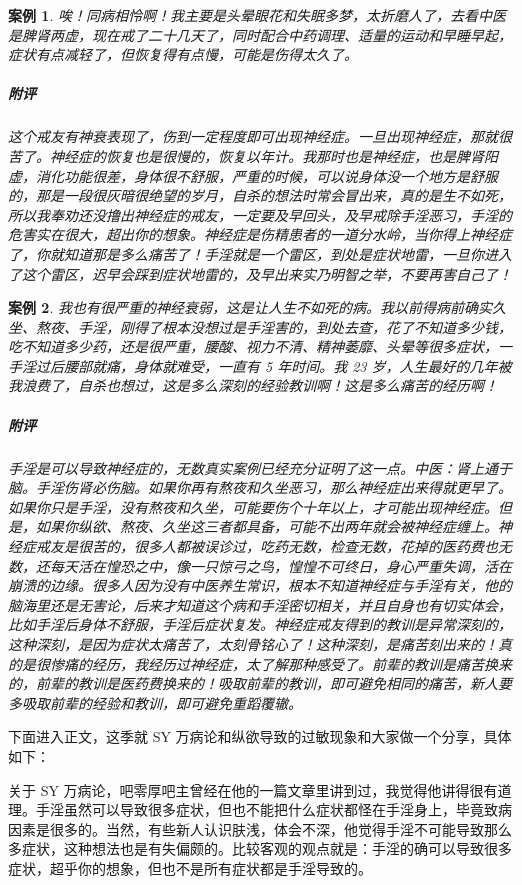 \documentclass{ctexart}
\newtheorem{case}{案例}
\begin{document}
\begin{case}
    唉！同病相怜啊！我主要是头晕眼花和失眠多梦，太折磨人了，去看中医是脾肾两虚，现在戒了二十几天了，同时配合中药调理、适量的运动和早睡早起，症状有点减轻了，但恢复得有点慢，可能是伤得太久了。
    \subparagraph{附评} 这个戒友有神衰表现了，伤到一定程度即可出现神经症。一旦出现神经症，那就很苦了。神经症的恢复也是很慢的，恢复以年计。我那时也是神经症，也是脾肾阳虚，消化功能很差，身体很不舒服，严重的时候，可以说身体没一个地方是舒服的，那是一段很灰暗很绝望的岁月，自杀的想法时常会冒出来，真的是生不如死，所以我奉劝还没撸出神经症的戒友，一定要及早回头，及早戒除手淫恶习，手淫的危害实在很大，超出你的想象。神经症是伤精患者的一道分水岭，当你得上神经症了，你就知道那是多么痛苦了！手淫就是一个雷区，到处是症状地雷，一旦你进入了这个雷区，迟早会踩到症状地雷的，及早出来实乃明智之举，不要再害自己了！
\end{case}

\begin{case}
    我也有很严重的神经衰弱，这是让人生不如死的病。我以前得病前确实久坐、熬夜、手淫，刚得了根本没想过是手淫害的，到处去查，花了不知道多少钱，吃不知道多少药，还是很严重，腰酸、视力不清、精神萎靡、头晕等很多症状，一手淫过后腰部就痛，身体就难受，一直有 5 年时间。我 23 岁，人生最好的几年被我浪费了，自杀也想过，这是多么深刻的经验教训啊！这是多么痛苦的经历啊！
    \subparagraph{附评} 手淫是可以导致神经症的，无数真实案例已经充分证明了这一点。中医：肾上通于脑。手淫伤肾必伤脑。如果你再有熬夜和久坐恶习，那么神经症出来得就更早了。如果你只是手淫，没有熬夜和久坐，可能要伤个十年以上，才可能出现神经症。但是，如果你纵欲、熬夜、久坐这三者都具备，可能不出两年就会被神经症缠上。神经症戒友是很苦的，很多人都被误诊过，吃药无数，检查无数，花掉的医药费也无数，还每天活在惶恐之中，像一只惊弓之鸟，惶惶不可终日，身心严重失调，活在崩溃的边缘。很多人因为没有中医养生常识，根本不知道神经症与手淫有关，他的脑海里还是无害论，后来才知道这个病和手淫密切相关，并且自身也有切实体会，比如手淫后身体不舒服，手淫后症状复发。神经症戒友得到的教训是异常深刻的，这种深刻，是因为症状太痛苦了，太刻骨铭心了！这种深刻，是痛苦刻出来的！真的是很惨痛的经历，我经历过神经症，太了解那种感受了。前辈的教训是痛苦换来的，前辈的教训是医药费换来的！吸取前辈的教训，即可避免相同的痛苦，新人要多吸取前辈的经验和教训，即可避免重蹈覆辙。
\end{case}

下面进入正文，这季就 SY 万病论和纵欲导致的过敏现象和大家做一个分享，具体如下：

关于 SY 万病论，吧零厚吧主曾经在他的一篇文章里讲到过，我觉得他讲得很有道理。手淫虽然可以导致很多症状，但也不能把什么症状都怪在手淫身上，毕竟致病因素是很多的。当然，有些新人认识肤浅，体会不深，他觉得手淫不可能导致那么多症状，这种想法也是有失偏颇的。比较客观的观点就是：手淫的确可以导致很多症状，超乎你的想象，但也不是所有症状都是手淫导致的。
\end{document}
